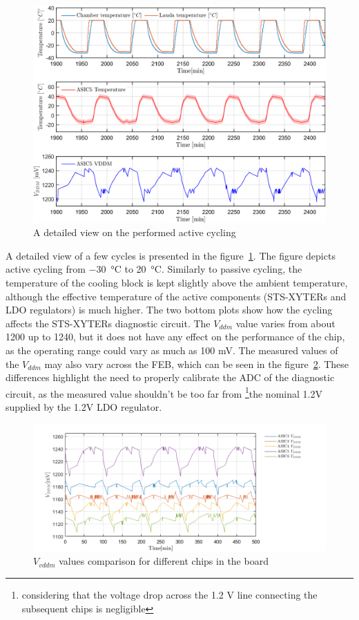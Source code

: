 \begin{figure}[!h]
\centering
\includegraphics[width=0.57\columnwidth]{Chapter4/images/FEB0ASIC5COMP.png}
\caption{A detailed view on the performed active cycling}
\label{fig_active_detailed}
\end{figure}

A detailed view of a few cycles is presented in the figure~\ref{fig_active_detailed}. The figure depicts active cycling from \SI{-30}{\celsius} to \SI{20}{\celsius}. Similarly to passive cycling, the temperature of the cooling block is kept slightly above the ambient temperature, although the effective temperature of the active components (STS-XYTERs and \gls{LDO} regulators) is much higher. The two bottom plots show how the cycling affects the STS-XYTERs diagnostic circuit. The $V_{ddm}$ value varies from about 1200 up to 1240, but it does not have any effect on the performance of the chip, as the operating range could vary as much as 100 mV. The measured values of the $V_{ddm}$ may also vary across the \gls{FEB}, which can be seen in the figure~\ref{feb_vary}. These differences highlight the need to properly calibrate the ADC of the diagnostic circuit, as the measured value shouldn't be too far from \footnote{considering that the voltage drop across the 1.2 V line connecting the subsequent chips is negligible}{the nominal 1.2V} supplied by the 1.2V \gls{LDO} regulator. 
\begin{figure}[!h]
\centering
\includegraphics[width=0.9\columnwidth]{Chapter4/images/vddm_comp.png}
\caption{$V_{vddm}$ values comparison for different chips in the board}
\label{feb_vary}
\end{figure}

